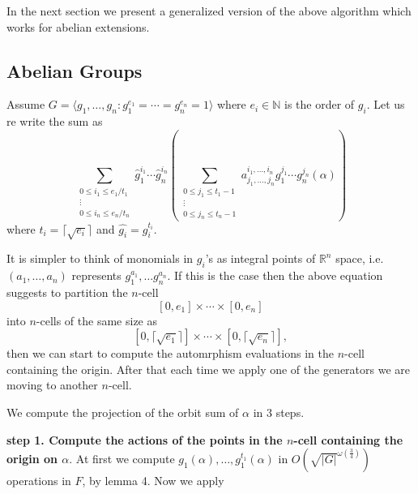 \documentclass[sigconf]{acmart}
\theoremstyle{acmplain}
\begin{document}
In the next section
we present a generalized version of the above algorithm which works for abelian extensions.

\subsection{Abelian Groups}
Assume $G = \langle g_1, \ldots , g_n: g_{1}^{e_1} = \cdots = g_{n}^{e_n} = 1 \rangle$ where $ e_i \in \mathbb{N}$
is the order of $g_i$. Let us re write the sum as 
$$\sum_{\substack{0 \leq i_1 \leq e_1/t_1 \\ \vdots \\ 0 \leq i_n \leq e_n/t_n}} \hat{g}_1^{i_1} \cdots \hat{g}_n^{i_n}(\sum_{\substack{0 \leq j_1 \leq t_1-1\\ \vdots \\ 0 \leq j_n \leq t_n-1}} a^{i_1, \ldots , i_n}_{j_1, \ldots , j_n}g_1^{j_1}\cdots g_n^{j_n}(\alpha))$$
where $t_i = \lceil \sqrt{e_i}\rceil$ and $\hat{g_i} = g_i ^{t_i}.$

It is simpler to think of monomials in $g_i$'s as integral points of $\mathbb{R}^n$ space, i.e.
$(a_1, \ldots , a_n)$ represents $g_1^{a_1}, \ldots g_n^{a_n}$. If this is the case then the above equation suggests to 
partition the $n$-cell $$[0,e_1] \times \cdots \times [0, e_n]$$ into $n$-cells of the same size as 
$$[0,\lceil \sqrt{e_1} \rceil] \times \cdots \times [0, \lceil \sqrt{e_n} \rceil],$$ 
then we can start to compute the automrphism evaluations in the $n$-cell containing the origin. After that each time we apply one 
of the generators we are moving to another $n$-cell.

We compute the projection of the orbit sum of $\alpha$ in 3 steps.

\textbf{step 1. Compute the actions of the points in the $n$-cell containing the origin on $\alpha$}. At first we compute 
$g_1(\alpha), \ldots , g_1^{t_1}(\alpha)$ in $O(\sqrt{\vert G \vert}^{\omega({\frac{3}{4}})})$ operations in $F$, by lemma 4. Now
we apply 
\end{document}
